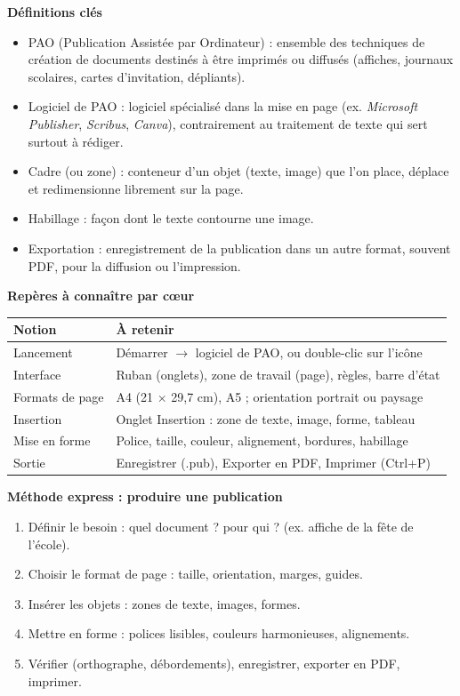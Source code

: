 \documentclass[11pt]{article}
\newcommand{\cle}[1]{{\popxbold\color{popdark}#1}}
\begin{document}
\begin{bilan}
\textbf{Définitions clés}
\begin{itemize}
  \item \cle{PAO} (Publication Assistée par Ordinateur) : ensemble des techniques de création de documents destinés à être imprimés ou diffusés (affiches, journaux scolaires, cartes d'invitation, dépliants).
  \item \cle{Logiciel de PAO} : logiciel spécialisé dans la mise en page (ex. \emph{Microsoft Publisher}, \emph{Scribus}, \emph{Canva}), contrairement au traitement de texte qui sert surtout à rédiger.
  \item \cle{Cadre} (ou zone) : conteneur d'un objet (texte, image) que l'on place, déplace et redimensionne librement sur la page.
  \item \cle{Habillage} : façon dont le texte contourne une image.
  \item \cle{Exportation} : enregistrement de la publication dans un autre format, souvent \cle{PDF}, pour la diffusion ou l'impression.
\end{itemize}

\textbf{Repères à connaître par cœur}
\begin{center}
\begin{tabularx}{\linewidth}{|l|X|}
\hline
\rowcolor{popblueL} \textbf{Notion} & \textbf{À retenir} \\
\hline
Lancement & Démarrer $\rightarrow$ logiciel de PAO, ou double-clic sur l'icône \\
\hline
Interface & Ruban (onglets), zone de travail (page), règles, barre d'état \\
\hline
Formats de page & A4 (21 $\times$ 29,7 cm), A5 ; orientation portrait ou paysage \\
\hline
Insertion & Onglet Insertion : zone de texte, image, forme, tableau \\
\hline
Mise en forme & Police, taille, couleur, alignement, bordures, habillage \\
\hline
Sortie & Enregistrer (.pub), Exporter en PDF, Imprimer (Ctrl+P) \\
\hline
\end{tabularx}
\end{center}

\textbf{Méthode express : produire une publication}
\begin{enumerate}
  \item Définir le besoin : quel document ? pour qui ? (ex. affiche de la fête de l'école).
  \item Choisir le format de page : taille, orientation, marges, guides.
  \item Insérer les objets : zones de texte, images, formes.
  \item Mettre en forme : polices lisibles, couleurs harmonieuses, alignements.
  \item Vérifier (orthographe, débordements), enregistrer, exporter en PDF, imprimer.
\end{enumerate}
\end{bilan}
\end{document}
